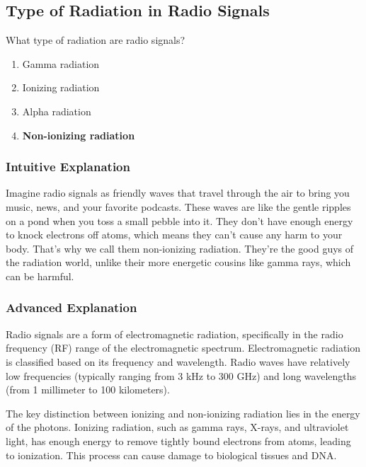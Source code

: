 \subsection{Type of Radiation in Radio Signals}
\label{T0C01}

\begin{tcolorbox}[colback=gray!10!white,colframe=black!75!black,title=T0C01]
What type of radiation are radio signals?
\begin{enumerate}[label=\Alph*)]
    \item Gamma radiation
    \item Ionizing radiation
    \item Alpha radiation
    \item \textbf{Non-ionizing radiation}
\end{enumerate}
\end{tcolorbox}

\subsubsection{Intuitive Explanation}
Imagine radio signals as friendly waves that travel through the air to bring you music, news, and your favorite podcasts. These waves are like the gentle ripples on a pond when you toss a small pebble into it. They don’t have enough energy to knock electrons off atoms, which means they can’t cause any harm to your body. That’s why we call them non-ionizing radiation. They’re the good guys of the radiation world, unlike their more energetic cousins like gamma rays, which can be harmful.

\subsubsection{Advanced Explanation}
Radio signals are a form of electromagnetic radiation, specifically in the radio frequency (RF) range of the electromagnetic spectrum. Electromagnetic radiation is classified based on its frequency and wavelength. Radio waves have relatively low frequencies (typically ranging from 3 kHz to 300 GHz) and long wavelengths (from 1 millimeter to 100 kilometers).

The key distinction between ionizing and non-ionizing radiation lies in the energy of the photons. Ionizing radiation, such as gamma rays, X-rays, and ultraviolet light, has enough energy to remove tightly bound electrons from atoms, leading to ionization. This process can cause damage to biological tissues and DNA.

